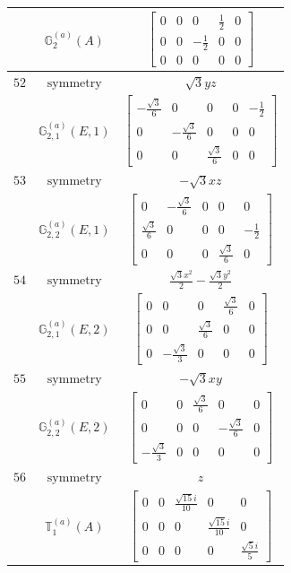 \documentclass[fleqn,8pt,landscape]{jsarticle}
\begin{document}
\begin{longtable}{ccc}
$  $ & $ \mathbb{G}_{2}^{(a)}(A) $ & $ \begin{bmatrix} 0 & 0 & 0 & \frac{1}{2} & 0 \\ 0 & 0 & - \frac{1}{2} & 0 & 0 \\ 0 & 0 & 0 & 0 & 0 \end{bmatrix} $ \\ \hline
$ 52 $ & $ \text{symmetry} $ & $ \sqrt{3} y z $ \\
$  $ & $ \mathbb{G}_{2,1}^{(a)}(E,1) $ & $ \begin{bmatrix} - \frac{\sqrt{3}}{6} & 0 & 0 & 0 & - \frac{1}{2} \\ 0 & - \frac{\sqrt{3}}{6} & 0 & 0 & 0 \\ 0 & 0 & \frac{\sqrt{3}}{6} & 0 & 0 \end{bmatrix} $ \\ \hline
$ 53 $ & $ \text{symmetry} $ & $ - \sqrt{3} x z $ \\
$  $ & $ \mathbb{G}_{2,2}^{(a)}(E,1) $ & $ \begin{bmatrix} 0 & - \frac{\sqrt{3}}{6} & 0 & 0 & 0 \\ \frac{\sqrt{3}}{6} & 0 & 0 & 0 & - \frac{1}{2} \\ 0 & 0 & 0 & \frac{\sqrt{3}}{6} & 0 \end{bmatrix} $ \\ \hline
$ 54 $ & $ \text{symmetry} $ & $ \frac{\sqrt{3} x^{2}}{2} - \frac{\sqrt{3} y^{2}}{2} $ \\
$  $ & $ \mathbb{G}_{2,1}^{(a)}(E,2) $ & $ \begin{bmatrix} 0 & 0 & 0 & \frac{\sqrt{3}}{6} & 0 \\ 0 & 0 & \frac{\sqrt{3}}{6} & 0 & 0 \\ 0 & - \frac{\sqrt{3}}{3} & 0 & 0 & 0 \end{bmatrix} $ \\ \hline
$ 55 $ & $ \text{symmetry} $ & $ - \sqrt{3} x y $ \\
$  $ & $ \mathbb{G}_{2,2}^{(a)}(E,2) $ & $ \begin{bmatrix} 0 & 0 & \frac{\sqrt{3}}{6} & 0 & 0 \\ 0 & 0 & 0 & - \frac{\sqrt{3}}{6} & 0 \\ - \frac{\sqrt{3}}{3} & 0 & 0 & 0 & 0 \end{bmatrix} $ \\ \hline
$ 56 $ & $ \text{symmetry} $ & $ z $ \\
$  $ & $ \mathbb{T}_{1}^{(a)}(A) $ & $ \begin{bmatrix} 0 & 0 & \frac{\sqrt{15} i}{10} & 0 & 0 \\ 0 & 0 & 0 & \frac{\sqrt{15} i}{10} & 0 \\ 0 & 0 & 0 & 0 & \frac{\sqrt{5} i}{5} \end{bmatrix} $ \\ \hline

\end{longtable}
\end{document}
